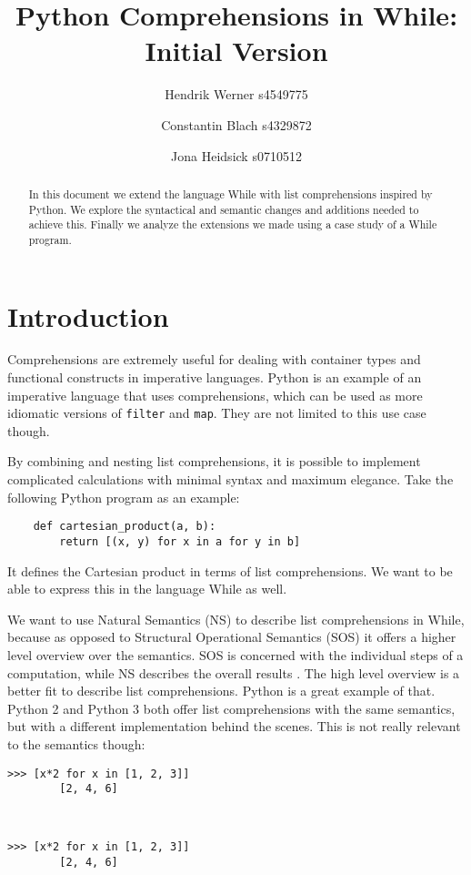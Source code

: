 \documentclass[12pt]{article}
\title{
    Python Comprehensions in While:\\
    Initial Version
}
\author{
    Hendrik Werner s4549775
    \and Constantin Blach s4329872
    \and Jona Heidsick s0710512
}
\newcommand\mono\texttt
\begin{document}
\maketitle

\begin{abstract}
\noindent %
In this document we extend the language While with list comprehensions inspired by Python. We explore the syntactical and semantic changes and additions needed to achieve this. Finally we analyze the extensions we made using a case study of a While program.
\end{abstract}

\section{Introduction}
Comprehensions are extremely useful for dealing with container types and functional constructs in imperative languages. Python is an example of an imperative language that uses comprehensions, which can be used as more idiomatic versions of \mono{filter} and \mono{map}. They are not limited to this use case though.

By combining and nesting list comprehensions, it is possible to implement complicated calculations with minimal syntax and maximum elegance. Take the following Python program as an example:

\begin{lstlisting}
    def cartesian_product(a, b):
        return [(x, y) for x in a for y in b]
\end{lstlisting}

It defines the Cartesian product in terms of list comprehensions. We want to be able to express this in the language While as well.

We want to use Natural Semantics (NS) to describe list comprehensions in While, because as opposed to Structural Operational Semantics (SOS) it offers a higher level overview over the semantics. SOS is concerned with the individual steps of a computation, while NS describes the overall results \cite{wiley}. The high level overview is a better fit to describe list comprehensions. Python is a great example of that. Python 2 and Python 3 both offer list comprehensions with the same semantics, but with a different implementation behind the scenes. This is not really relevant to the semantics though:

\begin{minipage}[t]{.48\linewidth}
    \begin{lstlisting}[gobble=8, title=Python 2]
        >>> [x*2 for x in [1, 2, 3]]
        [2, 4, 6]
    \end{lstlisting}
\end{minipage}
\,
\begin{minipage}[t]{.48\linewidth}
    \begin{lstlisting}[gobble=8, title=Python 3]
        >>> [x*2 for x in [1, 2, 3]]
        [2, 4, 6]
    \end{lstlisting}
\end{minipage}
\end{document}
